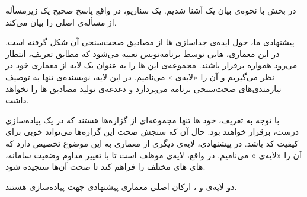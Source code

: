 در بخش  با نحوه‌ی بیان یک  آشنا شدیم. یک سناریو، در واقع پاسخ صحیح یک زیرمسأله از مسأله‌ی اصلی را بیان می‌کند.

 پیشنهادی ما، حول ایده‌ی جداسازی ‌ها از مصادیق صحت‌سنجی آن شکل گرفته است. در این معماری، ‌هایی توسط برنامه‌نویس تعبیه می‌شود که مطابق تعریف، انتظار می‌رود همواره برقرار باشند. مجموعه‌ی این ‌ها را به عنوان یک لایه از معماری   خود در نظر می‌گیریم و آن را «لایه‌ی » می‌نامیم. در این لایه، نویسنده‌ی  تنها به توصیف نیازمندی‌های صحت‌سنجی برنامه می‌پردازد و دغدغه‌ی تولید مصادیق ‌ها را نخواهد داشت.

با توجه به تعریف، خود ‌ها تنها مجموعه‌ای از گزاره‌ها هستند که در یک پیاده‌سازی درست، برقرار خواهند بود. حال آن که سنجش صحت این گزاره‌ها می‌تواند  خوبی برای کیفیت کد باشد. در  پیشنهادی، لایه‌ی دیگری از معماری  به این موضوع تخصیص دارد که آن را «لایه‌ی » می‌نامیم. در واقع، لایه‌ی  موظف است تا با تغییر مداوم وضعیت سامانه، ‌های ‌های مختلف را فراهم کند تا صحت آن‌ها سنجیده شود.

دو لایه‌ی  و ، ارکان اصلی معماری پیشنهادی جهت پیاده‌سازی   هستند.
